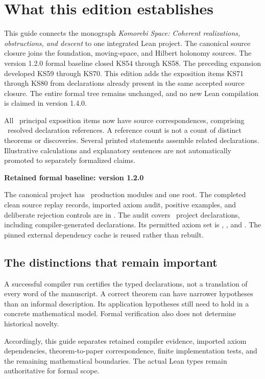 \documentclass[11pt]{article}
\begin{document}
\KomorebiCover
\section*{What this edition establishes}
This guide connects the monograph \emph{Komorebi Space: Coherent realizations, obstructions, and descent} to one integrated Lean project. The canonical source closure joins the foundation, moving-space, and Hilbert holonomy sources. The version 1.2.0 formal baseline closed KS54 through KS58. The preceding expansion developed KS59 through KS70. This edition adds the exposition items KS71 through KS80 from declarations already present in the same accepted source closure. The entire formal tree remains unchanged, and no new Lean compilation is claimed in version 1.4.0.

All \EditionClaims\ principal exposition items now have source correspondences, comprising \EditionReferences\ resolved declaration references. A reference count is not a count of distinct theorems or discoveries. Several printed statements assemble related declarations. Illustrative calculations and explanatory sentences are not automatically promoted to separately formalized claims.

\begin{scopebox}
\textbf{Retained formal baseline: version 1.2.0}\par
The canonical project has \EditionFormalModules\ production modules and one root. The completed clean source replay records, imported axiom audit, positive examples, and deliberate rejection controls are in . The audit covers \EditionAuditedDeclarations\ project declarations, including compiler-generated declarations. Its permitted axiom set is , , and . The pinned external dependency cache is reused rather than rebuilt.
\end{scopebox}

\subsection*{The distinctions that remain important}
A successful compiler run certifies the typed declarations, not a translation of every word of the manuscript. A correct theorem can have narrower hypotheses than an informal description. Its application hypotheses still need to hold in a concrete mathematical model. Formal verification also does not determine historical novelty.

Accordingly, this guide separates retained compiler evidence, imported axiom dependencies, theorem-to-paper correspondence, finite implementation tests, and the remaining mathematical boundaries. The actual Lean types remain authoritative for formal scope.
\end{document}
